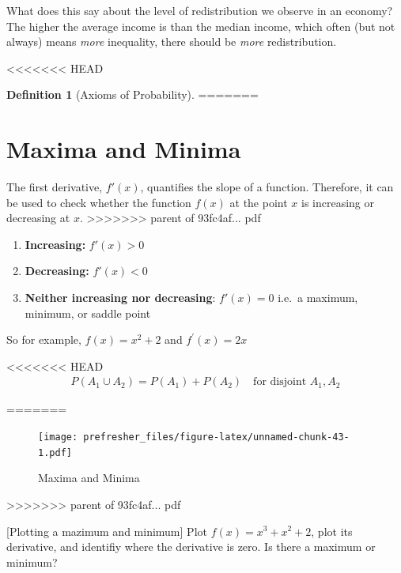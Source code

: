 \documentclass[]{book}
\providecommand{\tightlist}{%
  \setlength{\itemsep}{0pt}\setlength{\parskip}{0pt}}
\theoremstyle{definition}
\newtheorem{definition}{Definition}[chapter]
\theoremstyle{definition}
\theoremstyle{definition}
\theoremstyle{remark}
\begin{document}
What does this say about the level of redistribution we observe in an economy? The higher the average income is than the median income, which often (but not always) means \emph{more} inequality, there should be \emph{more} redistribution.

<<<<<<< HEAD
\begin{definition}[Axioms of Probability]
\protect\hypertarget{def:unnamed-chunk-67}{}{\label{def:unnamed-chunk-67} {} }
=======
\hypertarget{maxima-and-minima}{%
\section{Maxima and Minima}\label{maxima-and-minima}}

The first derivative, \(f'(x)\), quantifies the slope of a function. Therefore, it can be used to check whether the function \(f(x)\) at the point \(x\) is increasing or decreasing at \(x\).
>>>>>>> parent of 93fc4af... pdf

\begin{enumerate}
\def\labelenumi{\arabic{enumi}.}
\tightlist
\item
  \textbf{Increasing:} \(f'(x)>0\)
\item
  \textbf{Decreasing:} \(f'(x)<0\)
\item
  \textbf{Neither increasing nor decreasing}: \(f'(x)=0\)
  i.e.~a maximum, minimum, or saddle point
\end{enumerate}

So for example, \(f(x) = x^2 + 2\) and \(f^\prime(x) = 2x\)

<<<<<<< HEAD
\begin{align*}
P(A_1 \cup A_2) = P(A_1) + P(A_2) \quad\text{for disjoint } A_1, A_2
\end{align*}
\end{definition}
=======
\begin{figure}
\centering
\texttt{[image: prefresher\_files/figure-latex/unnamed-chunk-43-1.pdf]}
\caption{\label{fig:unnamed-chunk-43}Maxima and Minima}
\end{figure}
>>>>>>> parent of 93fc4af... pdf

[Plotting a mazimum and minimum]
\protect\hypertarget{exr:unnamed-chunk-44}{}{\label{exr:unnamed-chunk-44} {} }Plot \(f(x)=x^3+ x^2 + 2\), plot its derivative, and identifiy where the derivative is zero. Is there a maximum or minimum?
\end{document}
